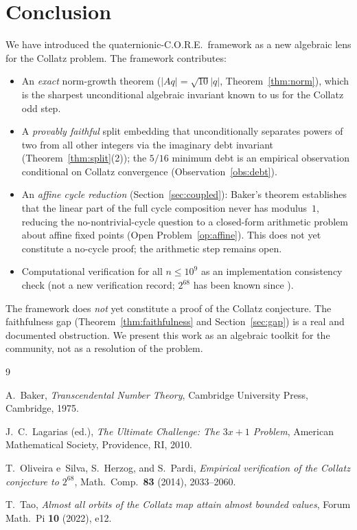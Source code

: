 \documentclass[12pt,reqno]{amsart}
\theoremstyle{plain}
\theoremstyle{definition}
\theoremstyle{remark}
\newcommand{\abs}[1]{\left|#1\right|}
\begin{document}
\section{Conclusion}
\label{sec:conclusion}

We have introduced the quaternionic-C.O.R.E.\ framework as a new
algebraic lens for the Collatz problem.  The framework contributes:
\begin{itemize}
  \item An \emph{exact} norm-growth theorem ($\abs{Aq} = \sqrt{10}\abs{q}$,
    Theorem~\ref{thm:norm}), which is the sharpest unconditional algebraic
    invariant known to us for the Collatz odd step.

  \item A \emph{provably faithful} split embedding that unconditionally
    separates powers of two from all other integers via the imaginary debt
    invariant (Theorem~\ref{thm:split}(2)); the $5/16$ minimum debt is an
    empirical observation conditional on Collatz convergence
    (Observation~\ref{obs:debt}).

  \item An \emph{affine cycle reduction} (Section~\ref{sec:coupled}):
    Baker's theorem establishes that the linear part of the full cycle
    composition never has modulus~$1$, reducing the no-nontrivial-cycle
    question to a closed-form arithmetic problem about affine fixed points
    (Open Problem~\ref{op:affine}).  This does not yet constitute a
    no-cycle proof; the arithmetic step remains open.

  \item Computational verification for all $n \leq 10^9$ as an
    implementation consistency check (not a new verification record;
    $2^{68}$ has been known since \cite{Oliveira2010}).
\end{itemize}

The framework does \emph{not} yet constitute a proof of the Collatz
conjecture.  The faithfulness gap (Theorem~\ref{thm:faithfulness} and
Section~\ref{sec:gap}) is a real and documented obstruction.
We present this work as an algebraic toolkit for the community,
not as a resolution of the problem.

\begin{thebibliography}{9}

A.~Baker, \textit{Transcendental Number Theory}, Cambridge University
Press, Cambridge, 1975.

J.~C.~Lagarias (ed.), \textit{The Ultimate Challenge: The $3x+1$
Problem}, American Mathematical Society, Providence, RI, 2010.

T.~Oliveira e~Silva, S.~Herzog, and S.~Pardi,
\textit{Empirical verification of the Collatz conjecture to $2^{68}$},
Math.\ Comp.\ \textbf{83} (2014), 2033--2060.

T.~Tao, \textit{Almost all orbits of the Collatz map attain almost
bounded values}, Forum Math.\ Pi \textbf{10} (2022), e12.

\end{thebibliography}
\end{document}

